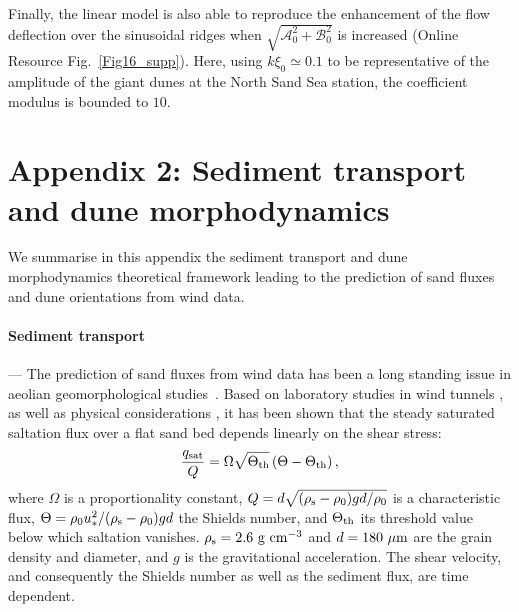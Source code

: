 Finally, the linear model is also able to reproduce the enhancement of the flow deflection over the sinusoidal ridges when $\sqrt{\mathcal{A}_{0}^{2} + \mathcal{B}_{0}^{2}}$ is increased (Online Resource Fig.~\ref{Fig16_supp}). Here, using $k\xi_0 \simeq 0.1$ to be representative of the amplitude of the giant dunes at the North Sand Sea station, the coefficient modulus is bounded to $10$.


\section*{Appendix 2: Sediment transport and dune morphodynamics}

We summarise in this appendix the sediment transport and dune morphodynamics theoretical framework leading to the prediction of sand fluxes and dune orientations from wind data.

\paragraph{Sediment transport} ---
The prediction of sand fluxes from wind data has been a long standing issue in aeolian geomorphological studies~\citep{Fryberger79, Pearce2005, Sherman2012, Shen2019}. Based on laboratory studies in wind tunnels \citep{Rasmussen96, Iversen99, Creyssels2009, Ho2011}, as well as physical considerations \citep{Ungar1987, Andreotti2004bis, Duran2011, Pahtz2020}, it has been shown that the steady saturated saltation flux over a flat sand bed depends linearly on the shear stress:
%
\begin{equation}
\label{transport_law_quadratic}
\frac{q_{\textup{sat}}}{Q} = \Omega\sqrt{\Theta_{\textup{th}}}\left(\Theta - \Theta_{\textup{th}}\right),
\end{equation}
%
where $\Omega$ is a proportionality constant, $Q = d\sqrt{(\rho_{\textup{s}} - \rho_{0})gd/\rho_{0}}$ is a characteristic flux, $\Theta = \rho_{0} u_{*}^{2}/(\rho_{\textup{s}} - \rho_{0})gd$ the Shields number, and $\Theta_{\textup{th}}$ its threshold value below which saltation vanishes. $\rho_{\textup{s}} = 2.6~\textup{g}~\textup{cm}^{-3}$ and $d=180~\mu\textup{m}$ are the grain density and diameter, and $g$ is the gravitational acceleration. The shear velocity, and consequently the Shields number as well as the sediment flux, are time dependent.


